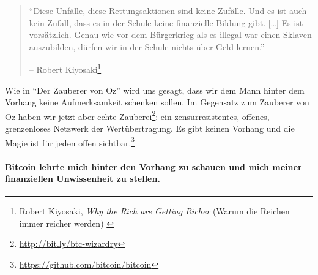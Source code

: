 \begin{quotation}\begin{samepage}
\enquote{Diese Unfälle, diese Rettungsaktionen sind keine Zufälle. Und es ist auch kein
Zufall, dass es in der Schule keine finanzielle Bildung gibt. [\ldots] Es ist
vorsätzlich. Genau wie vor dem Bürgerkrieg als es illegal war einen Sklaven
auszubilden, dürfen wir in der Schule nichts über Geld lernen.}
\begin{flushright} -- Robert Kiyosaki\footnote{Robert Kiyosaki, \textit{Why the Rich
are Getting Richer} (Warum die Reichen immer reicher werden) \cite{robert-kiyosaki}}
\end{flushright}\end{samepage}\end{quotation}

Wie in \enquote{Der Zauberer von Oz} wird uns gesagt, dass wir dem Mann hinter
dem Vorhang keine Aufmerksamkeit schenken sollen. Im Gegensatz zum Zauberer von
Oz haben wir jetzt aber echte
Zauberei\footnote{\url{http://bit.ly/btc-wizardry}}: ein zensurresistentes,
offenes, grenzenloses Netzwerk der Wertübertragung. Es gibt keinen Vorhang und
die Magie ist für jeden offen
sichtbar.\footnote{\url{https://github.com/bitcoin/bitcoin}}

\paragraph{Bitcoin lehrte mich hinter den Vorhang zu schauen und mich meiner
finanziellen Unwissenheit zu stellen.}

%
%
%
%

